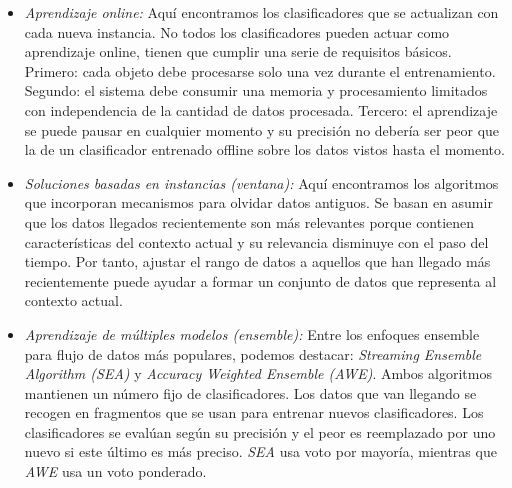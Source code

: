 \documentclass[11pt]{article}
\begin{document}
\begin{itemize}
	\item \textit{Aprendizaje online:} Aquí encontramos los clasificadores que se actualizan con cada nueva instancia. No todos los clasificadores pueden actuar como aprendizaje online, tienen que cumplir una serie de requisitos básicos. Primero: cada objeto debe procesarse solo una vez durante el entrenamiento. Segundo: el sistema debe consumir una memoria y procesamiento limitados con independencia de la cantidad de datos procesada. Tercero: el aprendizaje se puede pausar en cualquier momento y su precisión no debería ser peor que la de un clasificador entrenado offline sobre los datos vistos hasta el momento.
	\item \textit{Soluciones basadas en instancias (ventana):} Aquí encontramos los algoritmos que incorporan mecanismos para olvidar datos antiguos. Se basan en asumir que los datos llegados recientemente son más relevantes porque contienen características del contexto actual y su relevancia disminuye con el paso del tiempo. Por tanto, ajustar el rango de datos a aquellos que han llegado más recientemente puede ayudar a formar un conjunto de datos que representa al contexto actual.
	\item \textit{Aprendizaje de múltiples modelos (ensemble):} Entre los enfoques ensemble para flujo de datos más populares, podemos destacar:
	\textit{Streaming Ensemble Algorithm (SEA)} y \textit{Accuracy Weighted Ensemble (AWE)}. Ambos algoritmos mantienen un número fijo de clasificadores. Los datos que van llegando se recogen en fragmentos que se usan para entrenar nuevos clasificadores. Los clasificadores se evalúan según su precisión y el peor es reemplazado por uno nuevo si este último es más preciso. \textit{SEA} usa voto por mayoría, mientras que \textit{AWE} usa un voto ponderado.

\end{itemize}
\end{document}
